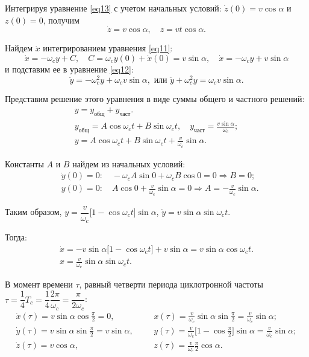    Интегрируя уравнение \eqref{eq13} с учетом начальных условий:
    \( \dot{z}(0) = v\cos\alpha \) и \( z(0) = 0 \), получим
    \[
        \dot{z} = v\cos\alpha, \quad z = vt\cos\alpha.
    \]
    
    Найдем \( \dot{x} \) интегрированием уравнения \eqref{eq11}:
    \[
        \dot{x} = -\omega_cy + C, \quad C = \omega_cy(0) + \dot{x}(0) =
        v\sin\alpha, \quad \dot{x} = -\omega_cy + v\sin\alpha
    \]
    и подставим ее в уравнение \eqref{eq12}:
    \[
        \ddot{y} = -\omega_c^2y + \omega_cv\sin\alpha, \text{ или }
        \ddot{y} + \omega_c^2y = \omega_cv\sin\alpha.
    \]
    
    Представим решение этого уравнения в виде суммы общего и частного решений:
    \begin{gather*}
        y = y_\text{общ} + y_\text{част}. \\
        y_\text{общ} = A\cos\omega_ct + B\sin\omega_ct, \quad
        y_\text{част} = \frac{v\sin\alpha}{\omega_c}; \\
        y = A\cos\omega_ct + B\sin\omega_ct + \frac{v}{\omega_c}\sin\alpha.
    \end{gather*}
    
    Константы \( A \) и \( B \) найдем из начальных условий:
    \begin{align*}
        & \dot{y}(0) = 0\colon \quad -\omega_cA\sin0 + \omega_cB\cos0 = 0
        \Rightarrow B = 0; \\
        & y(0) = 0\colon \quad A\cos0 + \frac{v}{\omega_c}\sin\alpha = 0
        \Rightarrow A = -\frac{v}{\omega_c}\sin\alpha.
    \end{align*}
    
    Таким образом, \( y = \dfrac{v}{\omega_c}\Big[1 - \cos\omega_ct\Big]
    \sin\alpha \), \( \dot{y} = v\sin\alpha\sin\omega_ct \).
    
    Тогда:
    \begin{gather*}
        \dot{x} = -v\sin\alpha\big[1 - \cos\omega_ct\big] + v\sin\alpha =
        v\sin\alpha\cos\omega_ct. \\
        x = \frac{v}{\omega_c}\sin\alpha\sin\omega_ct.
    \end{gather*}
    
    В момент времени \( \tau \), равный четверти периода циклотронной частоты
    \( \tau = \dfrac{1}{4}T_c = \dfrac{1}{4}\dfrac{2\pi}{\omega_c} =
    \dfrac{\pi}{2\omega_c} \):
    \begin{align*}
        \dot{x}(\tau) = v\sin\alpha\cos\frac{\pi}{2} = 0, & & &
        x(\tau) = \frac{v}{\omega_c}\sin\alpha\sin\frac{\pi}{2} =
        \frac{v}{\omega_c}\sin\alpha; \\
        \dot{y}(\tau) = v\sin\alpha\sin\frac{\pi}{2} = v\sin\alpha, & & &
        y(\tau) = \frac{v}{\omega_c}\Big[1 - \cos\frac{\pi}{2}\Big]\sin\alpha =
        \frac{v}{\omega_c}\sin\alpha; \\
        \dot{z}(\tau) = v\cos\alpha, & & &
        z(\tau) = \frac{v}{\omega_c}\frac{\pi}{2}\cos\alpha.
    \end{align*}
    
